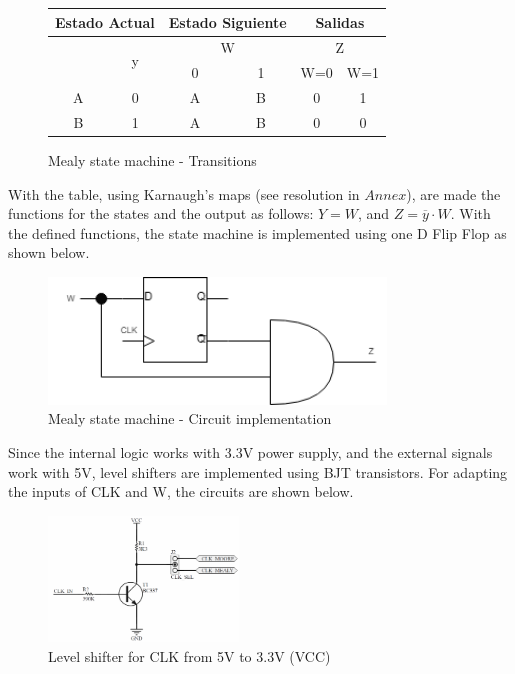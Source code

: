\begin{figure}[H]
    \begin{center}
        \begin{tabular}{|c|c|c|c||c|c|}
            \hline 
            \multicolumn{2}{|c|}{Estado Actual} & \multicolumn{2}{c||}{Estado Siguiente} & \multicolumn{2}{c|}{Salidas}\tabularnewline
            \hline 
            \hline 
            \multirow{2}{*}{} & \multirow{2}{*}{y} & \multicolumn{2}{c||}{W} & \multicolumn{2}{c|}{Z}\tabularnewline
            \cline{3-6} 
             &  & \multicolumn{1}{c|}{0} & \multicolumn{1}{c||}{1} & W=0 & W=1\tabularnewline
            \hline 
            A & 0 & A & B & 0 & 1\tabularnewline
            \hline 
            B & 1 & A & B & 0 & 0\tabularnewline
            \hline 
            \end{tabular}
        \caption{Mealy state machine - Transitions}
    \end{center}
\end{figure}

With the table, using Karnaugh's maps (see resolution in $Annex$), are made 
the functions for the states and the output as follows: $Y = W$, and $Z = \overline{y} \cdot W$.
With the defined functions, the state machine is 
implemented using one D Flip Flop as shown below.

\begin{figure}[H]
    \begin{centering}
    \includegraphics[width=0.8\textwidth]{Graficos3/3b_Compuertas_Mealy.png}
    \par\end{centering}
    \caption{Mealy state machine - Circuit implementation}
\end{figure}

\newpage
Since the internal logic works with 3.3V power supply, 
and the external signals work with 5V, level shifters 
are implemented using BJT transistors. For adapting
the inputs of CLK and W, the circuits are shown 
below. 

\begin{figure}[H]
    \begin{centering}
    \includegraphics[width=0.45\textwidth]{Graficos3/CLK_Driver.png}
    \par\end{centering}
    \caption{Level shifter for CLK from 5V to 3.3V (VCC)}
\end{figure}

